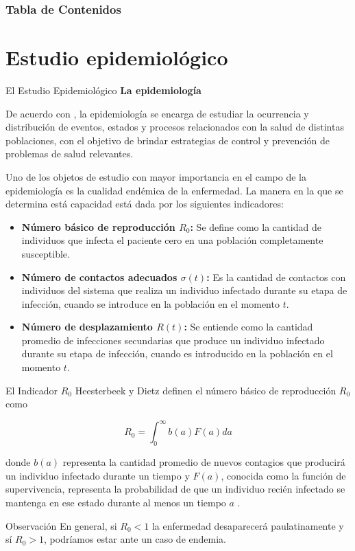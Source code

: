 \documentclass[9pt]{beamer}
\subtitle{\\
\LARGE{Predicción del comportamiento de una enfermedad} \\
\LARGE{simulada en autómatas celulares con un algoritmo}\\
\LARGE{propuesto en redes neuronales}}
\author{Jorge Andres Ibañez Huertas}
\institute{Central University, Bogotá}
\date{\today}
\begin{document}
\titlepage

\begin{frame}
\frametitle{Tabla de Contenidos}
\tableofcontents
\end{frame}

\section{Estudio epidemiológico}\label{sec:Estudio epidemiológico}
\begin{frame}{El Estudio Epidemiológico}
\textbf{La epidemiología}

De acuerdo con \cite{epiDictionary}, la epidemiología se encarga de estudiar la ocurrencia y distribución de eventos, estados y procesos relacionados con la salud de distintas poblaciones, con el objetivo de brindar estrategias de control y prevención de problemas de salud relevantes.

Uno de los objetos de estudio con mayor importancia en el campo de la epidemiología es la cualidad endémica de la enfermedad. La manera en la que se determina está capacidad está dada por los siguientes indicadores:

\begin{itemize}
    \item \textbf{Número básico de reproducción $R_0$:} Se define como la cantidad de individuos que infecta el paciente cero en una población completamente susceptible.
    \item \textbf{Número de contactos adecuados $\sigma(t)$:} Es la cantidad de contactos con individuos del sistema que realiza un individuo infectado durante su etapa de infección, cuando se introduce en la población en el momento $t$.
    \item \textbf{Número de desplazamiento $R(t)$:} Se entiende como la cantidad promedio de infecciones secundarias que produce un individuo infectado durante su etapa de infección, cuando es introducido en la población en el momento $t$.
\end{itemize}
\end{frame}

\begin{frame}{El Indicador $R_0$}
Heesterbeek y Dietz definen el número básico de reproducción $R_0$ como

\begin{equation}\label{eq:R0}
    R_0 = \int_0^\infty b(a)F(a) da
\end{equation}

donde $b(a)$ representa la cantidad promedio de nuevos contagios que producirá un individuo infectado durante un tiempo y $F(a)$, conocida como la función de supervivencia, representa la probabilidad de que un individuo recién infectado se mantenga en ese estado durante al menos un tiempo $a$ \cite{conceptOfR0, perspectivesOnR0}.

\begin{alertblock}{Observación}
En general, si $R_0<1$ la enfermedad desaparecerá paulatinamente y sí $R_0>1$, podríamos estar ante un caso de endemia.
\end{alertblock}
\end{frame}
\end{document}
